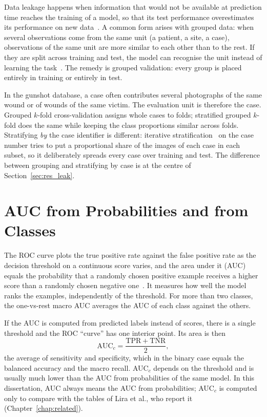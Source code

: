 Data leakage happens when information that would not be available at prediction time reaches the training of a model, so that its test performance overestimates its performance on new data~\cite{kapoor2023leakage}. A common form arises with grouped data: when several observations come from the same unit (a patient, a site, a case), observations of the same unit are more similar to each other than to the rest. If they are split across training and test, the model can recognise the unit instead of learning the task~\cite{roberts2017cross}. The remedy is grouped validation: every group is placed entirely in training or entirely in test.

In the gunshot database, a case often contributes several photographs of the same wound or of wounds of the same victim. The evaluation unit is therefore the case. Grouped $k$-fold cross-validation assigns whole cases to folds; stratified grouped $k$-fold does the same while keeping the class proportions similar across folds. Stratifying \emph{by} the case identifier is different: iterative stratification~\cite{sechidis2011stratification} on the case number tries to put a proportional share of the images of each case in each subset, so it deliberately spreads every case over training and test. The difference between grouping and stratifying by case is at the centre of Section~\ref{sec:res_leak}.

\section{AUC from Probabilities and from Classes}
\label{sec:auc_background}

The ROC curve plots the true positive rate against the false positive rate as the decision threshold on a continuous score varies, and the area under it (AUC) equals the probability that a randomly chosen positive example receives a higher score than a randomly chosen negative one~\cite{fawcett2006roc}. It measures how well the model ranks the examples, independently of the threshold. For more than two classes, the one-vs-rest macro AUC averages the AUC of each class against the others.

If the AUC is computed from predicted labels instead of scores, there is a single threshold and the ROC ``curve'' has one interior point. Its area is then
\begin{equation}
\mathrm{AUC}_c = \frac{\mathrm{TPR} + \mathrm{TNR}}{2},
\end{equation}
the average of sensitivity and specificity, which in the binary case equals the balanced accuracy and the macro recall. AUC$_c$ depends on the threshold and is usually much lower than the AUC from probabilities of the same model. In this dissertation, AUC always means the AUC from probabilities; AUC$_c$ is computed only to compare with the tables of Lira et al., who report it (Chapter~\ref{chap:related}).

